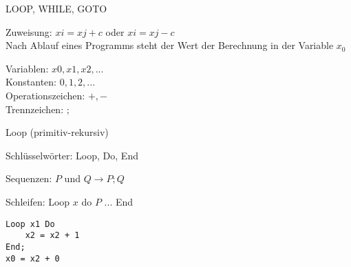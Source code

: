 \begin{minipage}
    {0.62\linewidth}
\begin{concept}{LOOP{,} WHILE{,} GOTO}

        Zuweisung: $xi = xj + c$ oder $xi = xj - c$\\
        Nach Ablauf eines Programms steht der Wert der Berechnung in der Variable $x_0$
\end{concept}
\end{minipage}
\begin{minipage}{0.34\linewidth}
    {\small
    Variablen: $x0, x1, x2, ...$\\
Konstanten: $0, 1, 2, ...$\\
Operationszeichen: $+, -$\\
Trennzeichen: $;$}
\end{minipage}

\begin{minipage}{0.5\linewidth}
    \begin{KR}{Loop (primitiv-rekursiv)}

            Schlüsselwörter: Loop, Do, End

            Sequenzen: $P$ und $Q \rightarrow P; Q$

            Schleifen: Loop $x$ do $P$ ... End
    \end{KR}
    \end{minipage}
    \begin{minipage}{0.5\linewidth}
    \begin{example}    
\begin{lstlisting}[style=Pseudocode, aboveskip=-0.5\baselineskip, belowskip=-0.5\baselineskip]
Loop x1 Do
    x2 = x2 + 1
End;
x0 = x2 + 0
\end{lstlisting}
    \end{example}
\end{minipage}

